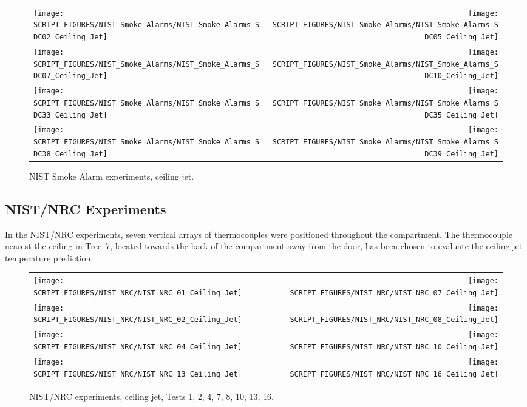 \newpage

\begin{figure}[p]
\begin{tabular*}{\textwidth}{l@{\extracolsep{\fill}}r}
\texttt{[image: SCRIPT\_FIGURES/NIST\_Smoke\_Alarms/NIST\_Smoke\_Alarms\_SDC02\_Ceiling\_Jet]} &
\texttt{[image: SCRIPT\_FIGURES/NIST\_Smoke\_Alarms/NIST\_Smoke\_Alarms\_SDC05\_Ceiling\_Jet]} \\
\texttt{[image: SCRIPT\_FIGURES/NIST\_Smoke\_Alarms/NIST\_Smoke\_Alarms\_SDC07\_Ceiling\_Jet]} &
\texttt{[image: SCRIPT\_FIGURES/NIST\_Smoke\_Alarms/NIST\_Smoke\_Alarms\_SDC10\_Ceiling\_Jet]} \\
\texttt{[image: SCRIPT\_FIGURES/NIST\_Smoke\_Alarms/NIST\_Smoke\_Alarms\_SDC33\_Ceiling\_Jet]} &
\texttt{[image: SCRIPT\_FIGURES/NIST\_Smoke\_Alarms/NIST\_Smoke\_Alarms\_SDC35\_Ceiling\_Jet]} \\
\texttt{[image: SCRIPT\_FIGURES/NIST\_Smoke\_Alarms/NIST\_Smoke\_Alarms\_SDC38\_Ceiling\_Jet]} &
\texttt{[image: SCRIPT\_FIGURES/NIST\_Smoke\_Alarms/NIST\_Smoke\_Alarms\_SDC39\_Ceiling\_Jet]}
\end{tabular*}
\caption[NIST Smoke Alarm experiments, ceiling jet]
{NIST Smoke Alarm experiments, ceiling jet.}
\label{NIST_Smoke_Alarms_Ceiling_Jet}
\end{figure}


\clearpage

\subsection{NIST/NRC Experiments}

In the NIST/NRC experiments, seven vertical arrays of thermocouples were positioned throughout the compartment.
The thermocouple nearest the ceiling in Tree~7, located towards the back of the compartment away from the door,
has been chosen to evaluate the ceiling jet temperature prediction.

\newpage

\begin{figure}[p]
\begin{tabular*}{\textwidth}{l@{\extracolsep{\fill}}r}
\texttt{[image: SCRIPT\_FIGURES/NIST\_NRC/NIST\_NRC\_01\_Ceiling\_Jet]} &
\texttt{[image: SCRIPT\_FIGURES/NIST\_NRC/NIST\_NRC\_07\_Ceiling\_Jet]} \\
\texttt{[image: SCRIPT\_FIGURES/NIST\_NRC/NIST\_NRC\_02\_Ceiling\_Jet]} &
\texttt{[image: SCRIPT\_FIGURES/NIST\_NRC/NIST\_NRC\_08\_Ceiling\_Jet]} \\
\texttt{[image: SCRIPT\_FIGURES/NIST\_NRC/NIST\_NRC\_04\_Ceiling\_Jet]} &
\texttt{[image: SCRIPT\_FIGURES/NIST\_NRC/NIST\_NRC\_10\_Ceiling\_Jet]} \\
\texttt{[image: SCRIPT\_FIGURES/NIST\_NRC/NIST\_NRC\_13\_Ceiling\_Jet]} &
\texttt{[image: SCRIPT\_FIGURES/NIST\_NRC/NIST\_NRC\_16\_Ceiling\_Jet]}
\end{tabular*}
\caption[NIST/NRC experiments, ceiling jet, Tests 1, 2, 4, 7, 8, 10, 13, 16]
{NIST/NRC experiments, ceiling jet, Tests 1, 2, 4, 7, 8, 10, 13, 16.}
\label{NIST_NRC_Jet_Closed}
\end{figure}

